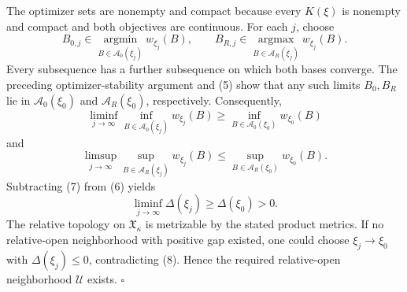 The optimizer sets are nonempty and compact because every \(K(\xi)\) is nonempty and compact and both objectives are continuous.  For each \(j\), choose
\[
B_{0,j}\in\operatorname*{argmin}_{B\in\mathcal A_0(\xi_j)}w_{\xi_j}(B),
\qquad
B_{R,j}\in\operatorname*{argmax}_{B\in\mathcal A_R(\xi_j)}w_{\xi_j}(B).
\]
Every subsequence has a further subsequence on which both bases converge.  The preceding optimizer-stability argument and (5) show that any such limits \(B_0,B_R\) lie in \(\mathcal A_0(\xi_0)\) and \(\mathcal A_R(\xi_0)\), respectively.  Consequently,
\[
\liminf_{j\to\infty}\inf_{B\in\mathcal A_0(\xi_j)}w_{\xi_j}(B)
\ge \inf_{B\in\mathcal A_0(\xi_0)}w_{\xi_0}(B)
\tag{6}
\]
and
\[
\limsup_{j\to\infty}\sup_{B\in\mathcal A_R(\xi_j)}w_{\xi_j}(B)
\le \sup_{B\in\mathcal A_R(\xi_0)}w_{\xi_0}(B).
\tag{7}
\]
Subtracting (7) from (6) yields
\[
\liminf_{j\to\infty}\Delta(\xi_j)\ge\Delta(\xi_0)>0.
\tag{8}
\]
The relative topology on \(\mathfrak X_\kappa\) is metrizable by the stated product metrics.  If no relative-open neighborhood with positive gap existed, one could choose \(\xi_j\to\xi_0\) with \(\Delta(\xi_j)\le0\), contradicting (8).  Hence the required relative-open neighborhood \(\mathcal U\) exists. \(\square\)